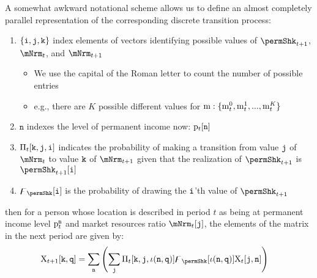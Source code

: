 \documentclass[\econtexRoot/BufferStockTheory]{subfiles}
\begin{document}
\newcommand{\nPermLvlVecNow}{\texttt{n}}\newcommand{\nPermLvlVecNxt}{\texttt{q}}\newcommand{\nPermShkNxtFunc}{\iota(\nPermLvlVecNow,\nPermLvlVecNxt)}\newcommand{\nPermShkVecNxt}{\texttt{i}}
\newcommand{\mNrmVecNow}{\mNrmVec_{t}^{\nmNrmVecNow}}
\newcommand{\mNrmVecNxt}{\mNrmVec_{t+1}^{\nmNrmVecNxt}}
\newcommand{\permShkVecNxt}{\permShk_{t+1}^{\nPermShkVecNxt}}
\newcommand{\permShkVecNow}{\permShk_{t}^{\nPermShkVecNow}}
\newcommand{\PermLvlNow}{\PermLvlPrb_{t}}
\newcommand{\PermLvlNxt}{\PermLvlPrb_{t+1}}
\newcommand{\PermLvlVecNow}{\PermLvlVec_{t}^{\nPermLvlVecNow}}
\newcommand{\PermLvlVecNxt}{\PermLvlVec_{t+1}^{\nPermLvlVecNxt}}

\noindent A somewhat awkward notational scheme allows us to define an almost completely parallel representation of the corresponding discrete transition process:
\begin{enumerate}
\item $\{\texttt{i}, \texttt{j}, \texttt{k}\}$ index elements of vectors identifying possible values of $\permShkPrbNxt$, $\mNrmNow$, and $\mNrmNxt$
  \begin{itemize}
  \item We use the capital of the Roman letter to count the number of possible entries
    \item e.g., there are $K$ possible different values for $\mathrm{m}:\{\mathrm{m}_{t}^{0},\mathrm{m}_{t}^{1},...,\mathrm{m}_{t}^{K}\}$
    \end{itemize}
\item $\nPermLvlVecNow$ indexes the level of permanent income now: $\PermLvlVec_{t}[\nPermLvlVecNow]$
\item$\Pi_{t}[\texttt{k},\texttt{j},\texttt{i}]$ indicates the probability of making a transition from value $\texttt{j}$ of $\mNrmNow$ to value $\texttt{k}$ of $\mNrmNxt$ given that the realization of $\permShkPrbNxt$ is $\permShkPrbNxt[\nPermShk]$
\item $\permShkVec[\nPermShk]$ is the probability of drawing the $\texttt{i}$'th value of $\permShkPrbNxt$
\end{enumerate}
then for a person whose location is described in period $t$ as being at permanent income level $\PermLvlVecNow$ and market resources ratio $\mNrmNow[\nmNrmVecNow]$, the elements of the matrix in the next period are given by:
\begin{equation}\begin{aligned} \label{eq:mpMattp1}
  \mpMat_{t+1}[\nmNrmVecNxt,\nPermLvlVecNxt] & = \sum_{\nPermLvlVecNow} \left(\sum_{\nmNrmVecNow} \lomdkMat_{t}[\nmNrmVecNxt,\nmNrmVecNow,\nPermShkNxtFunc]\permShkVec[\nPermShkNxtFunc]\mpMat_{t}[\nmNrmVecNow,\nPermLvlVecNow]  \right)
\end{aligned}\end{equation}
\end{document}
